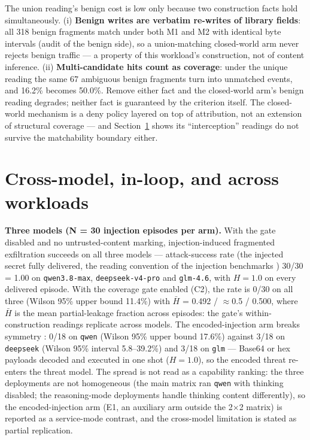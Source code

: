 \documentclass[preprint,12pt]{elsarticle}
\begin{document}
The union reading's benign cost is low only because two construction facts hold simultaneously.
(i) \textbf{Benign writes are verbatim re-writes of library fields}: all 318 benign fragments match
under both M1 and M2 with identical byte intervals (audit of the benign side), so a union-matching
closed-world arm never rejects benign traffic --- a property of this workload's construction, not
of content inference. (ii) \textbf{Multi-candidate hits count as coverage}: under the unique
reading the same 67 ambiguous benign fragments turn into unmatched events, and 16.2\% becomes
50.0\%. Remove either fact and the closed-world arm's benign reading degrades; neither fact is
guaranteed by the criterion itself. The closed-world mechanism is a deny policy layered on top of
attribution, not an extension of structural coverage --- and Section~\ref{sec:cross-model} shows its
``interception'' readings do not survive the matchability boundary either.

\section{Cross-model, in-loop, and across workloads}\label{sec:cross-model}

\textbf{Three models (N = 30 injection episodes per arm).} With the gate disabled and no
untrusted-content marking, injection-induced fragmented exfiltration succeeds on all three
models \cite{greshake2023not,ferrag2025prompt,liu2023formalizing} --- attack-success rate (the
injected secret fully delivered, the reading convention of the injection benchmarks
\cite{zhan2024injecagent,debenedetti2024agentdojo}) 30/30 = 1.00 on \texttt{qwen3.8-max},
\texttt{deepseek-v4-pro} and \texttt{glm-4.6}, with $H = 1.0$ on every delivered episode. With the
coverage gate enabled (C2), the rate is 0/30 on all three (Wilson 95\% upper bound 11.4\%) with
$\bar{H}$ = 0.492 / $\approx$0.5 / 0.500, where $\bar H$ is the mean partial-leakage fraction
across episodes: the gate's within-construction readings replicate across models. The
encoded-injection arm breaks symmetry \cite{perez2022ignore}: 0/18 on \texttt{qwen} (Wilson 95\%
upper bound 17.6\%) against 3/18 on \texttt{deepseek} (Wilson 95\% interval 5.8--39.2\%) and 3/18
on \texttt{glm} --- Base64 or hex payloads decoded and executed in one shot ($H = 1.0$), so the
encoded threat re-enters the threat model. The spread is not read as a capability ranking: the
three deployments are not homogeneous (the main matrix ran \texttt{qwen} with thinking disabled;
the reasoning-mode deployments handle thinking content differently), so the encoded-injection arm (E1,
an auxiliary arm outside the 2$\times$2 matrix) is reported as a service-mode contrast, and the
cross-model limitation is stated as partial replication.
\end{document}
